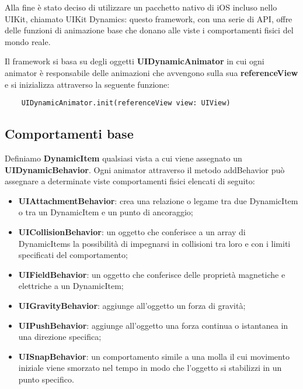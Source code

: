 Alla fine è stato deciso di utilizzare un pacchetto
nativo di iOS incluso nello UIKit\cite{uikit}, chiamato UIKit Dynamics\cite{uidynamics}: questo framework,
con una serie di API, offre delle funzioni di animazione base che 
donano alle viste i comportamenti fisici del mondo reale.

Il framework si basa su degli oggetti \textbf{UIDynamicAnimator} in cui ogni animator è responsabile delle
animazioni che avvengono sulla sua \textbf{referenceView} e si inizializza 
attraverso la seguente funzione:

\begin{verbatim}
    UIDynamicAnimator.init(referenceView view: UIView)
\end{verbatim}


\subsection{Comportamenti base}

Definiamo \textbf{DynamicItem} qualsiasi vista a cui viene assegnato un \textbf{UIDynamicBehavior}.
Ogni animator attraverso il metodo addBehavior può assegnare a determinate
viste comportamenti fisici elencati di seguito: 

\begin{itemize}
    \item\textbf{UIAttachmentBehavior}: crea una relazione o legame tra due DynamicItem o tra un DynamicItem e un punto di ancoraggio;
    \item\textbf{UICollisionBehavior}: un oggetto che conferisce a un array di DynamicItems la possibilità di impegnarsi in collisioni tra loro e con i limiti specificati del comportamento;
    \item\textbf{UIFieldBehavior}: un oggetto che conferisce delle proprietà magnetiche e elettriche a un DynamicItem;
    \item\textbf{UIGravityBehavior}: aggiunge all'oggetto un forza di gravità;
    \item\textbf{UIPushBehavior}: aggiunge all'oggetto una forza continua o istantanea in una direzione specifica;
    \item\textbf{UISnapBehavior}: un comportamento simile a una molla il cui movimento iniziale viene smorzato nel tempo in modo che l'oggetto si stabilizzi in un punto specifico.
\end{itemize}


